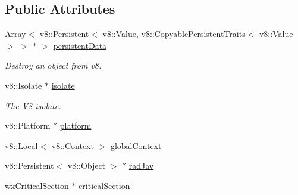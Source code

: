 \subsection*{Public Attributes}
\begin{DoxyCompactItemize}
\item 
\mbox{\hyperlink{class_rad_j_a_v_1_1_array}{Array}}$<$ v8\+::\+Persistent$<$ v8\+::\+Value, v8\+::\+Copyable\+Persistent\+Traits$<$ v8\+::\+Value $>$ $>$ $\ast$ $>$ \mbox{\hyperlink{class_rad_j_a_v_1_1_v8_javascript_engine_ac2ecff7e8c02bef18a9b23e776b183c9}{persistent\+Data}}
\begin{DoxyCompactList}\small\item\em Destroy an object from v8. \end{DoxyCompactList}\item 
v8\+::\+Isolate $\ast$ \mbox{\hyperlink{class_rad_j_a_v_1_1_v8_javascript_engine_a41236f05ac4ee41c64a9b5d913a19a32}{isolate}}
\begin{DoxyCompactList}\small\item\em The V8 isolate. \end{DoxyCompactList}\item 
v8\+::\+Platform $\ast$ \mbox{\hyperlink{class_rad_j_a_v_1_1_v8_javascript_engine_a6fe5450e6b86a5885af9a3601bcc8ea1}{platform}}
\item 
v8\+::\+Local$<$ v8\+::\+Context $>$ \mbox{\hyperlink{class_rad_j_a_v_1_1_v8_javascript_engine_a0990155ad5fa72dbb88988beb6bf767e}{global\+Context}}
\item 
v8\+::\+Persistent$<$ v8\+::\+Object $>$ $\ast$ \mbox{\hyperlink{class_rad_j_a_v_1_1_v8_javascript_engine_a6a6562df248aedfaf92dceecbee9c777}{rad\+Jav}}
\item 
wx\+Critical\+Section $\ast$ \mbox{\hyperlink{class_rad_j_a_v_1_1_v8_javascript_engine_a1585d63e5888148ed80dfd589f1f5c52}{critical\+Section}}
\end{DoxyCompactItemize}
